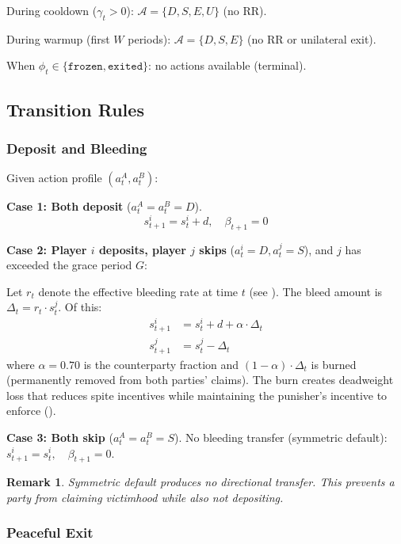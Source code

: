 \documentclass[12pt,a4paper]{article}
\newtheorem{remark}{Remark}
\begin{document}
During cooldown ($\gamma_t > 0$): $\mathcal{A} = \{D, S, E, U\}$ (no RR).

During warmup (first $W$ periods): $\mathcal{A} = \{D, S, E\}$ (no RR or unilateral exit).

When $\phi_t \in \{\texttt{frozen}, \texttt{exited}\}$: no actions available (terminal).

\subsection{Transition Rules}
\label{sec:transitions}

\subsubsection{Deposit and Bleeding}

Given action profile $(a_t^A, a_t^B)$:

\textbf{Case 1: Both deposit} ($a_t^A = a_t^B = D$).
\[
s_{t+1}^i = s_t^i + d, \quad \beta_{t+1} = 0
\]

\textbf{Case 2: Player $i$ deposits, player $j$ skips} ($a_t^i = D, a_t^j = S$), and $j$ has exceeded the grace period $G$:

Let $r_t$ denote the effective bleeding rate at time $t$ (see ). The bleed amount is $\Delta_t = r_t \cdot s_t^j$. Of this:
\begin{align}
s_{t+1}^i &= s_t^i + d + \alpha \cdot \Delta_t \label{eq:bleed-to-counterparty} \\
s_{t+1}^j &= s_t^j - \Delta_t \label{eq:bleed-from-defaulter}
\end{align}
where $\alpha = 0.70$ is the counterparty fraction and $(1-\alpha) \cdot \Delta_t$ is burned (permanently removed from both parties' claims). The burn creates deadweight loss that reduces spite incentives while maintaining the punisher's incentive to enforce ().

\textbf{Case 3: Both skip} ($a_t^A = a_t^B = S$).
No bleeding transfer (symmetric default):
$s_{t+1}^i = s_t^i, \quad \beta_{t+1} = 0$.

\begin{remark}
Symmetric default produces no directional transfer. This prevents a party from claiming victimhood while also not depositing.
\end{remark}

\subsubsection{Peaceful Exit}
\end{document}
